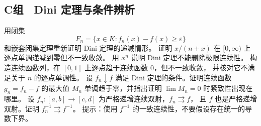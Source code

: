 \subsection*{C组　Dini 定理与条件辨析}
\begin{enumerate}[label=\textbf{\thechapter.\arabic*.},resume]
 用闭集
 \[
  F_n=\{x\in K:f_n(x)-f(x)\ge\varepsilon\}
 \]
 和嵌套闭集定理重新证明 Dini 定理的递减情形。
 证明 \(x/(n+x)\) 在 \([0,\infty)\) 上逐点单调递减到零但不一致收敛。
 用 \(x^n\) 说明 Dini 定理不能删除极限连续性。
 构造连续函数列，在 \([0,1]\) 上逐点趋于连续函数 \(0\)，但不一致收敛，
 并核对它不满足关于 \(n\) 的逐点单调性。
 设 \(f_n\downarrow f\) 满足 Dini 定理的条件。证明连续函数
 \(g_n=f_n-f\) 的最大值 \(M_n\) 单调趋于零，并指出证明
 \(\lim M_n=0\) 时紧致性出现在哪里。
 设 \(f_n:[a,b]\to[c,d]\) 为严格递增连续双射，\(f_n\rightrightarrows f\)，
 且 \(f\) 也是严格递增双射。证明 \(f_n^{-1}\rightrightarrows f^{-1}\)。
 提示：使用 \(f^{-1}\) 的一致连续性，不要假设存在统一的导数下界。
\end{enumerate}
